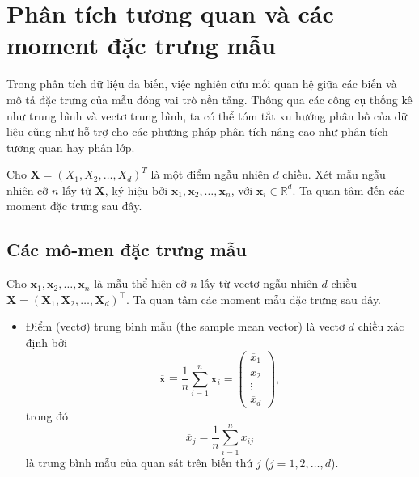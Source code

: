 

\section{Phân tích tương quan và các moment đặc trưng mẫu}

Trong phân tích dữ liệu đa biến, việc nghiên cứu mối quan hệ giữa các biến và mô tả đặc trưng của mẫu đóng vai trò nền tảng. Thông qua các công cụ thống kê như trung bình và vectơ trung bình, ta có thể tóm tắt xu hướng phân bố của dữ liệu cũng như hỗ trợ cho các phương pháp phân tích nâng cao như phân tích tương quan hay phân lớp.

Cho $\bm{X} = (X_1, X_2, \dots, X_d)^T$ là một điểm ngẫu nhiên $d$ chiều. Xét mẫu ngẫu nhiên cỡ $n$ lấy từ $\bm{X}$, ký hiệu bởi $\bm{x}_1, \bm{x}_2, \dots, \bm{x}_{n}$, với $\bm{x}_i \in \mathbb{R}^d$. Ta quan tâm đến các moment đặc trưng sau đây.

\subsection{Các mô-men đặc trưng mẫu}

Cho $\bm{x}_{1}, \bm{x}_{2}, \dots, \bm{x}_{n}$ là mẫu thể hiện cỡ $n$ lấy từ vectơ ngẫu nhiên $d$ chiều $\bm{X} = (\bm{X}_1, \bm{X}_2, \dots, \bm{X}_d)^\top$. Ta quan tâm các moment mẫu đặc trưng sau đây.
\begin{itemize}
	\item Điểm (vectơ) trung bình mẫu (the sample mean vector) là vectơ  $d$ chiều xác định bởi
	\begin{equation}
		\overline{\bm{x}} \equiv \frac{1}{n} \sum_{i=1}^{n} \bm{x}_i = \begin{pmatrix} 
			\overline{x}_1 \\ 
			\overline{x}_2 \\ 
			\vdots \\ 
			\overline{x}_d 
		\end{pmatrix},
	\end{equation}
	trong đó
	\begin{equation}
		\overline{x}_j = \frac{1}{n} \sum_{i=1}^{n} x_{ij}
	\end{equation}
	là trung bình mẫu của quan sát trên biến thứ $j$ ($j = 1, 2, \dots, d$).
\end{itemize}


